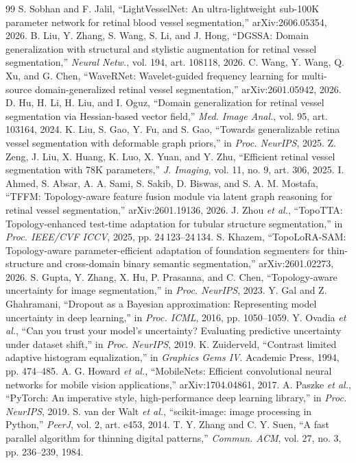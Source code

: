 \documentclass[conference]{IEEEtran}
\begin{document}
\begin{thebibliography}{99}
 S. Sobhan and F. Jalil, ``LightVesselNet: An ultra-lightweight sub-100K parameter network for retinal blood vessel segmentation,'' arXiv:2606.05354, 2026.
 B. Liu, Y. Zhang, S. Wang, S. Li, and J. Hong, ``DGSSA: Domain generalization with structural and stylistic augmentation for retinal vessel segmentation,'' \emph{Neural Netw.}, vol. 194, art. 108118, 2026.
 C. Wang, Y. Wang, Q. Xu, and G. Chen, ``WaveRNet: Wavelet-guided frequency learning for multi-source domain-generalized retinal vessel segmentation,'' arXiv:2601.05942, 2026.
 D. Hu, H. Li, H. Liu, and I. Oguz, ``Domain generalization for retinal vessel segmentation via Hessian-based vector field,'' \emph{Med. Image Anal.}, vol. 95, art. 103164, 2024.
 K. Liu, S. Gao, Y. Fu, and S. Gao, ``Towards generalizable retina vessel segmentation with deformable graph priors,'' in \emph{Proc. NeurIPS}, 2025.
 Z. Zeng, J. Liu, X. Huang, K. Luo, X. Yuan, and Y. Zhu, ``Efficient retinal vessel segmentation with 78K parameters,'' \emph{J. Imaging}, vol. 11, no. 9, art. 306, 2025.
 I. Ahmed, S. Absar, A. A. Sami, S. Sakib, D. Biswas, and S. A. M. Mostafa, ``TFFM: Topology-aware feature fusion module via latent graph reasoning for retinal vessel segmentation,'' arXiv:2601.19136, 2026.
 J. Zhou \emph{et al.}, ``TopoTTA: Topology-enhanced test-time adaptation for tubular structure segmentation,'' in \emph{Proc. IEEE/CVF ICCV}, 2025, pp. 24\,123--24\,134.
 S. Khazem, ``TopoLoRA-SAM: Topology-aware parameter-efficient adaptation of foundation segmenters for thin-structure and cross-domain binary semantic segmentation,'' arXiv:2601.02273, 2026.
 S. Gupta, Y. Zhang, X. Hu, P. Prasanna, and C. Chen, ``Topology-aware uncertainty for image segmentation,'' in \emph{Proc. NeurIPS}, 2023.
 Y. Gal and Z. Ghahramani, ``Dropout as a Bayesian approximation: Representing model uncertainty in deep learning,'' in \emph{Proc. ICML}, 2016, pp. 1050--1059.
 Y. Ovadia \emph{et al.}, ``Can you trust your model's uncertainty? Evaluating predictive uncertainty under dataset shift,'' in \emph{Proc. NeurIPS}, 2019.
 K. Zuiderveld, ``Contrast limited adaptive histogram equalization,'' in \emph{Graphics Gems IV}. Academic Press, 1994, pp. 474--485.
 A. G. Howard \emph{et al.}, ``MobileNets: Efficient convolutional neural networks for mobile vision applications,'' arXiv:1704.04861, 2017.
 A. Paszke \emph{et al.}, ``PyTorch: An imperative style, high-performance deep learning library,'' in \emph{Proc. NeurIPS}, 2019.
 S. van der Walt \emph{et al.}, ``scikit-image: image processing in Python,'' \emph{PeerJ}, vol. 2, art. e453, 2014.
 T. Y. Zhang and C. Y. Suen, ``A fast parallel algorithm for thinning digital patterns,'' \emph{Commun. ACM}, vol. 27, no. 3, pp. 236--239, 1984.
\end{thebibliography}
\end{document}
